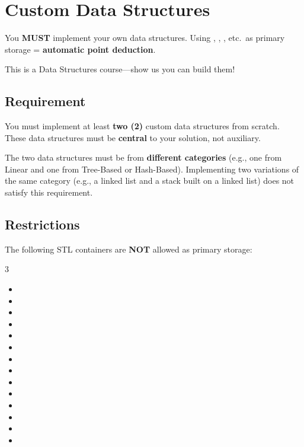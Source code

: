 
\section{Custom Data Structures}

\begin{constraintbox}
You \textbf{MUST} implement your own data structures. Using \stdvec, \stdmap, \stdlist, etc.\ as primary storage = \textbf{automatic point deduction}.

\vspace{4pt}
This is a Data Structures course---show us you can build them!
\end{constraintbox}

\subsection{Requirement}

You must implement at least \textbf{two (2)} custom data structures from scratch. These data structures must be \textbf{central} to your solution, not auxiliary.

The two data structures must be from \textbf{different categories} (e.g., one from Linear and one from Tree-Based or Hash-Based). Implementing two variations of the same category (e.g., a linked list and a stack built on a linked list) does not satisfy this requirement.

\subsection{Restrictions}

The following STL containers are \textbf{NOT} allowed as primary storage:

\begin{multicols}{3}
\begin{itemize}
  \item \stdvec
  \item \stdlist
  \item {}
  \item {}
  \item {}
  \item \stdset
  \item {}
  \item \stdmap
  \item {}
  \item {}
  \item {}
  \item {}
  \item {}
  \item {}
\end{itemize}
\end{multicols}

